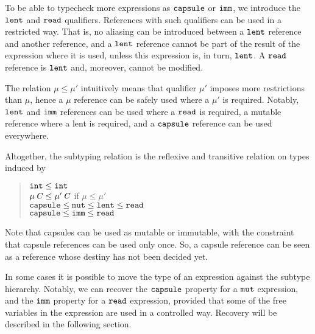 To be able to typecheck more expressions as $\texttt{capsule}$ or $\texttt{imm}$, 
we introduce the $\texttt{lent}$ and $\texttt{read}$ qualifiers.
References with such qualifiers can be used in a restricted way. That is, no aliasing can be introduced between a $\texttt{lent}$ reference and another reference, and a $\texttt{lent}$ reference cannot be part of the result of the expression where it is used, unless this expression is, in turn, $\texttt{lent}$. A $\texttt{read}$ reference is $\texttt{lent}$ and, moreover, cannot be modified.

The relation $\mu\leq\mu'$ intuitively means that qualifier $\mu'$ imposes more restrictions than $\mu$, hence a $\mu$ reference can be safely used where a $\mu'$ is required.
Notably,  $\texttt{lent}$ and $\texttt{imm}$ references can be used where a $\texttt{read}$ is required, a mutable reference where a lent is required, and a $\texttt{capsule}$ reference can be used everywhere. 

{Altogether, the subtyping relation is the reflexive and transitive relation on types induced by
\begin{quote}
{$\texttt{int}\leq\texttt{int}$}\\
$\mu\,\mathit{C}\leq\mu'\,\mathit{C}$ if $\mu\leq\mu'$\\
$\texttt{capsule}\leq\texttt{mut}\leq\texttt{lent}\leq\texttt{read}$\\
$\texttt{capsule}\leq\texttt{imm}\leq\texttt{read}$
\end{quote}
Note that capsules can be used as mutable or immutable, with the constraint that capsule references can be used only once.
So, a capsule reference can be seen as a reference whose destiny has not been decided yet.

In some cases it is possible to move the type of an expression against the subtype hierarchy. Notably, {we can recover the $\texttt{capsule}$ property for a $\texttt{mut}$ expression, and the $\texttt{imm}$ property for a $\texttt{read}$ expression}, provided that some of the free variables in the expression are used in a controlled way. Recovery will be described in the following section.}

